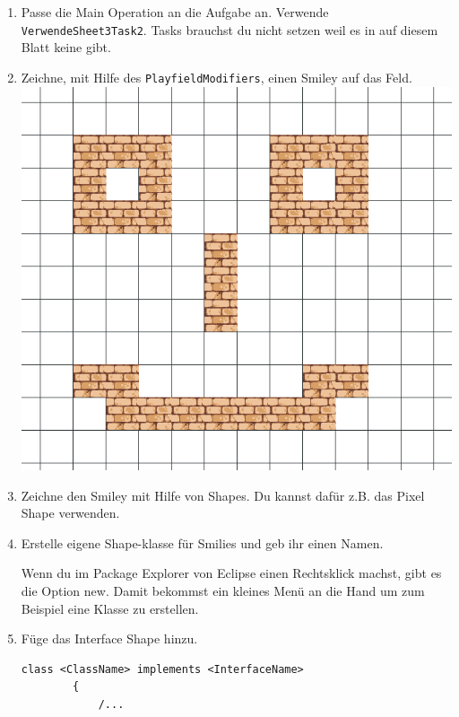 \begin{enumerate}
    \item Passe die Main Operation an die Aufgabe an. Verwende \lstinline{VerwendeSheet3Task2}. Tasks brauchst du nicht setzen weil es in auf diesem Blatt keine gibt.
    \item Zeichne, mit Hilfe des \lstinline{PlayfieldModifiers}, einen Smiley auf das Feld.
    \\ \includegraphics[width=\linewidth]{./figures/smily.png}
    \item Zeichne den Smiley mit Hilfe von Shapes. Du kannst dafür z.B. das Pixel Shape verwenden.
    \item Erstelle eigene Shape-klasse für Smilies und geb ihr einen Namen.
    \begin{Infobox}
        Wenn du im Package Explorer von Eclipse einen Rechtsklick machst, gibt es die Option new.
        Damit bekommst ein kleines Menü an die Hand um zum Beispiel eine Klasse zu erstellen.
    \end{Infobox}
    \item Füge das Interface Shape hinzu.
    \begin{lstlisting}[title=Interface Syntax,frame=ltr]
        class <ClassName> implements <InterfaceName>
        {
            /...
    \end{lstlisting}
    \begin{Infobox}[Interface]

\end{Infobox}
\end{enumerate}
